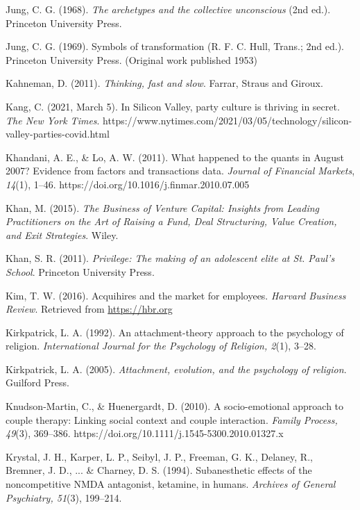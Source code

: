 \begin{thebibliography}{}
    Jung, C. G. (1968). \textit{The archetypes and the collective unconscious} (2nd ed.). Princeton University Press.

    Jung, C. G. (1969). Symbols of transformation (R. F. C. Hull, Trans.; 2nd ed.). Princeton University Press. (Original work published 1953)

    
    Kahneman, D. (2011). \textit{Thinking, fast and slow}. Farrar, Straus and Giroux.

    Kang, C. (2021, March 5). In Silicon Valley, party culture is thriving in secret. \textit{The New York Times}. https://www.nytimes.com/2021/03/05/technology/silicon-valley-parties-covid.html

    Khandani, A. E., \& Lo, A. W. (2011). What happened to the quants in August 2007? Evidence from factors and transactions data. \textit{Journal of Financial Markets}, \textit{14}(1), 1–46. https://doi.org/10.1016/j.finmar.2010.07.005
    
    Khan, M. (2015). \textit{The Business of Venture Capital: Insights from Leading Practitioners on the Art of Raising a Fund, Deal Structuring, Value Creation, and Exit Strategies}. Wiley.

    Khan, S. R. (2011). \textit{Privilege: The making of an adolescent elite at St. Paul's School}. Princeton University Press.

    Kim, T. W. (2016). Acquihires and the market for employees. \textit{Harvard Business Review}. Retrieved from \url{https://hbr.org}

    Kirkpatrick, L. A. (1992). An attachment-theory approach to the psychology of religion. \textit{International Journal for the Psychology of Religion, 2}(1), 3–28.

    Kirkpatrick, L. A. (2005). \textit{Attachment, evolution, and the psychology of religion}. Guilford Press.

    Knudson-Martin, C., \& Huenergardt, D. (2010). A socio-emotional approach to couple therapy: Linking social context and couple interaction. \textit{Family Process, 49}(3), 369–386. https://doi.org/10.1111/j.1545-5300.2010.01327.x

    Krystal, J. H., Karper, L. P., Seibyl, J. P., Freeman, G. K., Delaney, R., Bremner, J. D., ... \& Charney, D. S. (1994). Subanesthetic effects of the noncompetitive NMDA antagonist, ketamine, in humans. \textit{Archives of General Psychiatry, 51}(3), 199–214.


\end{thebibliography}

